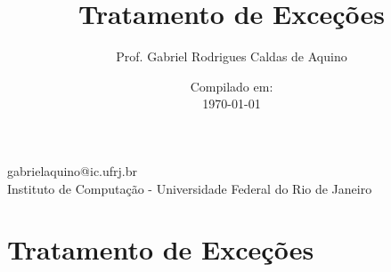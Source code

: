 
\title{Tratamento de Exceções}

\author{Prof. Gabriel Rodrigues Caldas de Aquino}

\institute
{
    gabrielaquino@ic.ufrj.br\\

    Instituto de Computação -
    Universidade Federal do Rio de Janeiro %
}
\date{Compilado em: \\ \today} %



\section{Tratamento de Exceções}

\begin{frame}
    \titlepage
\end{frame}



